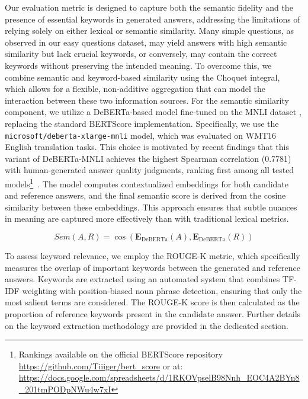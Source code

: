 \documentclass[sigconf]{acmart}
\begin{document}
Our evaluation metric is designed to capture both the semantic fidelity and the presence of essential keywords in generated answers, addressing the limitations of relying solely on either lexical or semantic similarity. Many simple questions, as observed in our easy questions dataset, may yield answers with high semantic similarity but lack crucial keywords, or conversely, may contain the correct keywords without preserving the intended meaning. To overcome this, we combine semantic and keyword-based similarity using the Choquet integral, which allows for a flexible, non-additive aggregation that can model the interaction between these two information sources.
For the semantic similarity component, we utilize a DeBERTa-based model \cite{deberta} fine-tuned on the MNLI dataset \cite{naacl_2018}, replacing the standard BERTScore implementation. Specifically, we use the \texttt{microsoft/deberta-xlarge-mnli} model, which was evaluated on WMT16 \cite{wmt_2016} English translation tasks. This choice is motivated by recent findings that this variant of DeBERTa-MNLI achieves the highest Spearman correlation (0.7781) with human-generated answer quality judgments, ranking first among all tested models\footnote{Rankings available on the official BERTScore repository \url{https://github.com/Tiiiger/bert_score} or at: \url{https://docs.google.com/spreadsheets/d/1RKOVpselB98Nnh_EOC4A2BYn8_201tmPODpNWu4w7xI}}~\cite{emnlp_2015}. The model computes contextualized embeddings for both candidate and reference answers, and the final semantic score is derived from the cosine similarity between these embeddings. This approach ensures that subtle nuances in meaning are captured more effectively than with traditional lexical metrics.

\begin{equation}
    Sem(A, R) = \cos(\mathbf{E}_{\text{DeBERTa}}(A), \mathbf{E}_{\text{DeBERTa}}(R))
\end{equation}

To assess keyword relevance, we employ the ROUGE-K \cite{rouge_k} metric, which specifically measures the overlap of important keywords between the generated and reference answers. Keywords are extracted using an automated system that combines TF-IDF weighting with position-biased noun phrase detection, ensuring that only the most salient terms are considered. The ROUGE-K score is then calculated as the proportion of reference keywords present in the candidate answer. Further details on the keyword extraction methodology are provided in the dedicated section.
\end{document}
